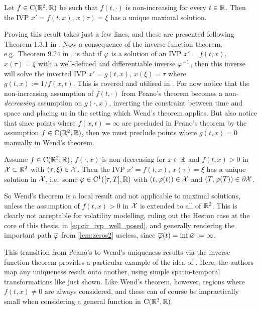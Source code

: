 \begin{theorem}
    Let $f\in\mathrm{C}(\mathbb{R}^2,\mathbb{R})$ be such that $f(t,\cdot)$ is non-increasing for every $t\in\mathbb{R}$. Then the IVP $x'=f(t,x)$, $x(\tau)=\xi$ has a unique maximal solution.
\end{theorem}

Proving this result takes just a few lines, and these are presented following Theorem 1.3.1 in \cite{agarwal_1993}. Now a consequence of the inverse function theorem, e.g.~Theorem 9.24 in \cite{rudin_1976}, is that if $\varphi$ is a solution of an IVP $x'=f(t,x)$, $x(\tau)=\xi$ with a well-defined and differentiable inverse $\varphi^{-1}$, then this inverse will solve the inverted IVP $x'=g(t,x)$, $x(\xi)=\tau$ where $g(t,x):=1/f(x,t)$. This is covered and utilised in \cite{cid_2009}. For now notice that the non-increasing assumption of $f(t,\cdot)$ from Peano's theorem becomes a non-\emph{decreasing} assumption on $g(\cdot,x)$, inverting the constraint between time and space and placing us in the setting which Wend's theorem applies. But also notice that since points where $f(x,t)=\infty$ are precluded in Peano's theorem by the assumption $f\in\mathrm{C}(\mathbb{R}^2,\mathbb{R})$, then we must preclude points where $g(t,x)=0$ manually in Wend's theorem.

\begin{theorem}\label{thm:wend_uniqueness}
    Assume $f\in\mathrm{C}(\mathbb{R}^2,\mathbb{R})$, $f(\cdot,x)$ is non-decreasing for $x\in\mathbb{R}$ and $f(t,x)>0$ in $\mathcal{X}\subset\mathbb{R}^2$ with $(\tau,\xi)\in\mathcal{X}$. Then the IVP $x'=f(t,x)$, $x(\tau)=\xi$ has a unique solution in $\mathcal{X}$, i.e.~some $\varphi\in\mathrm{C}^1([\tau,T],\mathbb{R})$ with $(t,\varphi(t))\in\mathcal{X}$ and $(T,\varphi(T))\in\partial\mathcal{X}$.
\end{theorem}

So Wend's theorem is a local result and not applicable to maximal solutions, unless the assumption of $f(t,x)>0$ in $\mathcal{X}$ is extended to all of $\mathbb{R}^2$. This is clearly not acceptable for volatility modelling, ruling out the Heston case at the core of this thesis, in \autoref{eq:cir_ivp_well_posed}, and generally rendering the important path $\overline{\varphi}$ from \autoref{lem:zeros2} useless, since $\overline{\varphi}(t)=\inf\varnothing:=\infty$.

This transition from Peano's to Wend's uniqueness results via the inverse function theorem provides a particular example of the idea of \cite{cid_2009}. Here, the authors map any uniqueness result onto another, using simple spatio-temporal transformations like just shown. Like Wend's theorem, however, regions where $f(t,x)\neq 0$ are always considered, and these can of course be impractically small when considering a general function in $\mathrm{C}(\mathbb{R}^2,\mathbb{R})$.

